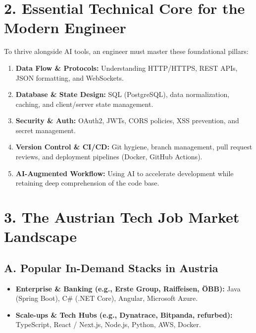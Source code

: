 \documentclass[11pt,a4paper]{article}
\begin{document}
\section{2. Essential Technical Core for the Modern Engineer}

To thrive alongside AI tools, an engineer must master these foundational pillars:

\begin{enumerate}[leftmargin=1.5em]
    \item \textbf{Data Flow \& Protocols:} Understanding HTTP/HTTPS, REST APIs, JSON formatting, and WebSockets.
    \item \textbf{Database \& State Design:} SQL (PostgreSQL), data normalization, caching, and client/server state management.
    \item \textbf{Security \& Auth:} OAuth2, JWTs, CORS policies, XSS prevention, and secret management.
    \item \textbf{Version Control \& CI/CD:} Git hygiene, branch management, pull request reviews, and deployment pipelines (Docker, GitHub Actions).
    \item \textbf{AI-Augmented Workflow:} Using AI to accelerate development while retaining deep comprehension of the code base.
\end{enumerate}

\section{3. The Austrian Tech Job Market Landscape}

\subsection{A. Popular In-Demand Stacks in Austria}
\begin{itemize}[leftmargin=1.5em]
    \item \textbf{Enterprise \& Banking (e.g., Erste Group, Raiffeisen, ÖBB):} Java (Spring Boot), C\# (.NET Core), Angular, Microsoft Azure.
    \item \textbf{Scale-ups \& Tech Hubs (e.g., Dynatrace, Bitpanda, refurbed):} TypeScript, React / Next.js, Node.js, Python, AWS, Docker.
\end{itemize}
\end{document}
